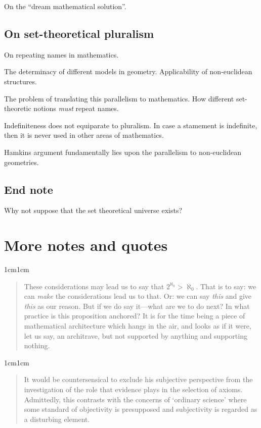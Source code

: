 \documentclass[11pt,a4paper]{book}
\theoremstyle{plain}
\begin{document}
On the ``dream mathematical solution''.

\section{On set-theoretical pluralism}

On repeating names in mathematics. 

The determinacy of different models in geometry. Applicability of non-euclidean structures.

The problem of translating this parallelism to mathematics. How different set-theoretic notions \textit{must} repeat names.

Indefiniteness does not equiparate to pluralism. In case a stamement is indefinite, then it is never used in other areas of mathematics. 

Hamkins argument fundamentally lies upon the parallelism to non-euclidean geometries.

\section{End note}
Why not suppose that the set theoretical universe exists?

\chapter*{More notes and quotes}
\begin{adjustwidth}{1cm}{1cm}
  \small
  \begin{quote}
These considerations may lead us to say that $2^{\aleph_0} > \aleph_0$. That is to say: we can \emph{make} the considerations lead us to that. Or: we can say \emph{this} and give \emph{this} as our reason. But if we do say it---what are we to do next? In what practice is this proposition anchored? It is for the time being a piece of mathematical architecture which hangs in the air, and looks as if it were, let us say, an architrave, but not supported by anything and supporting nothing. \parencite[III, §35]{Wittgenstein1978}
  \end{quote}
\end{adjustwidth}


\begin{adjustwidth}{1cm}{1cm}
  \small
  \begin{quote}
It would be countersensical to exclude his subjective perspective from the investigation of the role that evidence plays in the selection of axioms. Admittedly, this contrasts with the concerns of ‘ordinary science’ where some standard of objectivity is presupposed and subjectivity is regarded as a disturbing element. \textcite[p. 104]{hauser2004}
  \end{quote}
\end{adjustwidth}
\end{document}

